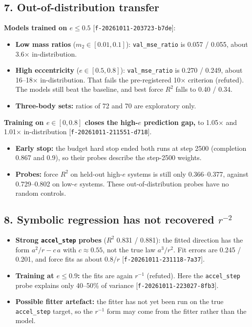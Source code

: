 \documentclass{article}
\begin{document}
\subsection{7. Out-of-distribution transfer}

\textbf{Models trained on $e \le 0.5$} [\texttt{f-20261011-203723-b7de}]:

\begin{itemize}
\item \textbf{Low mass ratios} ($m_2 \in [0.01, 0.1]$): \texttt{val\_mse\_ratio} is 0.057 / 0.055, about 3.6× in-distribution.
\item \textbf{High eccentricity} ($e \in [0.5, 0.8]$): \texttt{val\_mse\_ratio} is 0.270 / 0.249, about 16–18× in-distribution. That fails the pre-registered 10× criterion (refuted). The models still beat the baseline, and best force $R^2$ falls to 0.40 / 0.34.
\item \textbf{Three-body sets:} ratios of 72 and 70 are exploratory only.
\end{itemize}

\textbf{Training on $e \in [0, 0.8]$ closes the high-$e$ prediction gap,} to 1.05× and 1.01× in-distribution [\texttt{f-20261011-211551-d718}].

\begin{itemize}
\item \textbf{Early stop:} the budget hard stop ended both runs at step 2500 (completion 0.867 and 0.9), so their probes describe the step-2500 weights.
\item \textbf{Probes:} force $R^2$ on held-out high-$e$ systems is still only 0.366–0.377, against 0.729–0.802 on low-$e$ systems. These out-of-distribution probes have no random controls.
\end{itemize}

\subsection{8. Symbolic regression has not recovered $r^{-2}$}

\begin{itemize}
\item \textbf{Strong \texttt{accel\_step} probes} ($R^2$ 0.831 / 0.881): the fitted direction has the form $a^2/r - c\,a$ with $c \approx 0.55$, not the true law $a^3/r^2$. Fit errors are 0.245 / 0.201, and force fits as about $0.8/r$ [\texttt{f-20261011-231118-7a37}].
\item \textbf{Training at $e \le 0.9$:} the fits are again $r^{-1}$ (refuted). Here the \texttt{accel\_step} probe explains only 40–50\% of variance [\texttt{f-20261011-223027-8fb3}].
\item \textbf{Possible fitter artefact:} the fitter has not yet been run on the true \texttt{accel\_step} target, so the $r^{-1}$ form may come from the fitter rather than the model.
\end{itemize}
\end{document}
